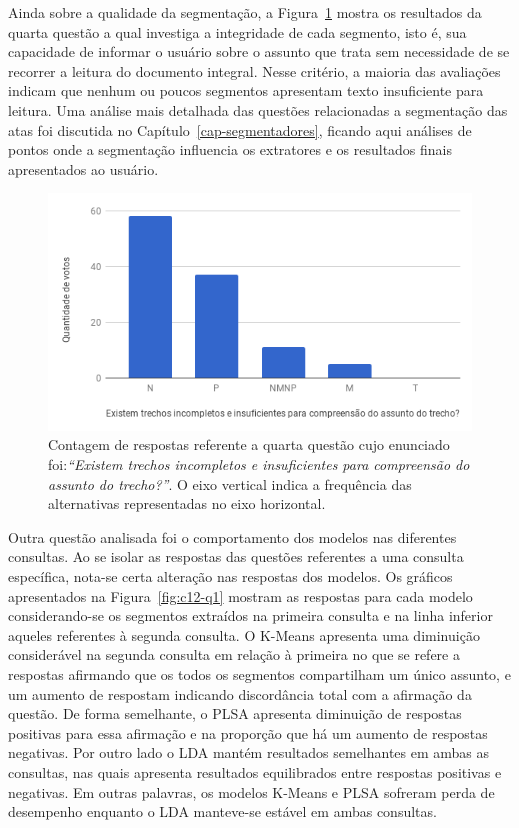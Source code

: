 Ainda sobre a qualidade da segmentação, a Figura~\ref{fig:Q4} mostra os resultados da quarta questão a qual investiga a integridade de cada segmento, isto é, sua capacidade de informar o usuário sobre o assunto que trata sem necessidade de se recorrer a leitura do documento integral. Nesse critério, a maioria das avaliações indicam que nenhum ou poucos segmentos apresentam texto insuficiente para leitura.  Uma análise mais detalhada das questões relacionadas a segmentação das atas foi discutida no Capítulo~\ref{cap-segmentadores}, ficando aqui análises de pontos onde a segmentação influencia os extratores e os resultados finais apresentados ao usuário.


\begin{figure}[!h] \centering     %

		\includegraphics[width=.48\textwidth]{conteudo/capitulos/figs/figuras-experimento/Q4-Seg.png}
	\caption{Contagem de respostas referente a quarta questão cujo enunciado foi:\textit{``Existem trechos incompletos e insuficientes para compreensão do assunto do trecho?''}. O eixo vertical indica a frequência das alternativas representadas no eixo horizontal. }
	\label{fig:Q4}
\end{figure}


Outra questão analisada foi o comportamento dos modelos nas diferentes consultas. Ao se isolar as respostas das questões referentes a uma consulta específica, nota-se certa alteração nas respostas dos modelos. 
Os gráficos apresentados na Figura~\ref{fig:c12-q1} mostram 
as respostas para cada modelo considerando-se os segmentos extraídos na primeira consulta e na linha inferior aqueles referentes à segunda consulta. O K-Means apresenta uma diminuição considerável na segunda consulta em relação à primeira no que se refere a respostas afirmando que os todos os segmentos compartilham um único assunto, e um aumento de respostam indicando discordância total com a afirmação da questão.
De forma semelhante, o PLSA apresenta diminuição de respostas positivas para essa afirmação e na proporção que há um aumento de respostas negativas. 
Por outro lado o LDA mantém resultados semelhantes em ambas as consultas, nas quais apresenta resultados equilibrados entre respostas positivas e negativas. Em outras palavras, os modelos K-Means e PLSA sofreram perda de desempenho enquanto o LDA manteve-se estável em ambas consultas.





